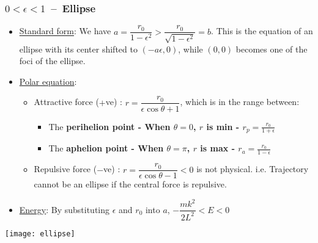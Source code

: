 \documentclass[class=article, crop=false, 12pt]{standalone}
\begin{document}
\newpage
\subsubsection{$0<\epsilon <1$ \,--\, Ellipse}

\begin{itemize}
    \item \ul{Standard form}: We have $a= \dfrac{r_0}{1-\epsilon^2} > \dfrac{r_0}{\sqrt{1-\epsilon^2}} = b$.
    This is the equation of an ellipse with its center shifted to $(-a\epsilon,0)$,
    while $(0,0)$ becomes one of the foci of the ellipse.

    \item \ul{Polar equation}:
    
    \begin{itemize}
        \item Attractive force ($+$ve) : $r=\dfrac{r_0}{\epsilon\cos\theta + 1}$,
        which is in the range between:
        \begin{itemize}
            \item The \bf{perihelion} point - When $\theta=0$, $r$ is min - $\boxed{r_p = \frac{r_0}{1+\epsilon}}$
            
            \item The \bf{aphelion} point - When $\theta=\pi$, $r$ is max - $\boxed{r_a = \frac{r_0}{1-\epsilon}}$
        \end{itemize}
    
        \item Repulsive force ($-$ve) : $r=\dfrac{r_0}{\epsilon\cos\theta - 1} <0$ is not physical. 
        i.e. Trajectory cannot be an ellipse if the central force is repulsive.

    \end{itemize}
    
    \item \ul{Energy}: By substituting $\epsilon$ and $r_0$ into $a$, $\boxed{ -\dfrac{mk^2}{2L^2} < E < 0}$
\end{itemize}

\begin{center}
    \begin{minipage}{0.8\linewidth}
        \centering
        \texttt{[image: ellipse]}
    \end{minipage}
\end{center}
\end{document}
